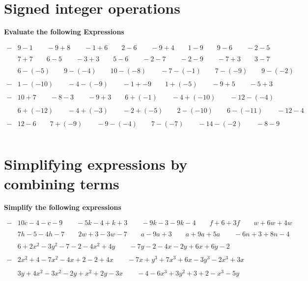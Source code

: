 \documentclass{article}
\begin{document}
\section{Signed integer operations}

\textbf{Evaluate the following Expressions}


\bigskip

\(\begin{aligned}
	-&9-1 \qquad -9+8 \qquad -1+6 \qquad 2-6 \qquad -9+4 \qquad 1-9 \qquad 9-6 \qquad -2-5\\\\
	&7+7 \qquad 6-5 \qquad -3+3 \qquad 5-6 \qquad -2-7 \qquad -2-9 \qquad -7+3\qquad 3-7\\\\
	&6-(-5) \qquad 9-(-4) \qquad 10-(-8) \qquad -7-(-1) \qquad 7-(-9) \qquad 9-(-2) \\\\
	-&1-(-10) \qquad -4-(-9) \qquad -1+-9 \qquad 1+(-5)\qquad -9+5 \qquad -5+3  \\\\
	-&10+7 \qquad -8-3 \qquad -9+3 \qquad 6+(-1) \qquad -4+(-10) \qquad -12-(-4)\\\\
	&6+(-12) \qquad -4+(-3) \qquad  -2+(-5) \qquad 2-(-10) \qquad 6-(-11) \qquad -12-4 \\\\
	-&12-6 \qquad 7+(-9) \qquad  -9-(-4) \qquad 7-(-7) \qquad -14-(-2) \qquad -8-9 \\\\
\end{aligned}\)
\bigskip
\bigskip
\section{Simplifying expressions by combining terms}

\textbf{Simplify the following expressions}

\bigskip

\(\begin{aligned}
	-&10c-4-c-9 \qquad -5k-4+k+3 \qquad -9k-3-9k-4 \qquad f+6+3f \qquad w+6w+4w \\\\
	&7h-5-4h-7 \qquad 2w+3-3w-7 \qquad a-9a+3 \qquad a+9a+5a \qquad -6n+3+8n-4 \\\\
	&6+2x^2-3y^2-7-2-4x^2+4y \qquad -7y-2-4x-2y+6x+6y-2\\\\
	-&2x^2+4-7x^2-4x+2-2+4x \qquad -7x+y^3+7x^3+6x-3y^3-2x^3+3x \\\\
	&3y+4x^2-3x^2-2y+x^2+2y-3x \qquad -4-6x^3+3y^2+3+2-x^3-5y \\\\
\end{aligned}\)
\end{document}
